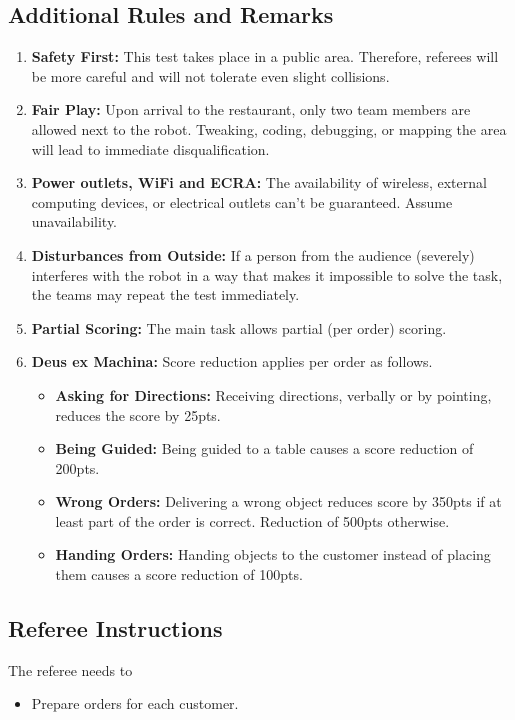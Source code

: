 \subsection*{Additional Rules and Remarks}
\begin{enumerate}[nosep]
	\item \textbf{Safety First:} This test takes place in a public area. Therefore, referees will be more careful and will not tolerate even slight collisions.
	
	\item \textbf{Fair Play:} Upon arrival to the restaurant, only two team members are allowed next to the robot. Tweaking, coding, debugging, or mapping the area will lead to immediate disqualification.
	
	\item \textbf{Power outlets, WiFi and ECRA:} The availability of wireless, external computing devices, or electrical outlets can't be guaranteed. Assume unavailability.
	
	\item \textbf{Disturbances from Outside:} If a person from the audience (severely) interferes with the robot in a way that makes it impossible to solve the task, the teams may repeat the test immediately.
	
	\item \textbf{Partial Scoring:} The main task allows partial (per order) scoring.
	
	\item \textbf{Deus ex Machina:} Score reduction applies per order as follows.
	\begin{itemize}[nosep]
		\item\textbf{Asking for Directions:} Receiving directions, verbally or by pointing, reduces the score by 25pts.
		\item\textbf{Being Guided:} Being guided to a table causes a score reduction of 200pts.
		\item\textbf{Wrong Orders:} Delivering a wrong object reduces score by 350pts if at least part of the order is correct. Reduction of 500pts otherwise.
		\item\textbf{Handing Orders:} Handing objects to the customer instead of placing them causes a score reduction of 100pts.
	\end{itemize}


\end{enumerate}


\subsection*{Referee Instructions}
The referee needs to
\begin{itemize}
	\item Prepare orders for each customer.
\end{itemize}


